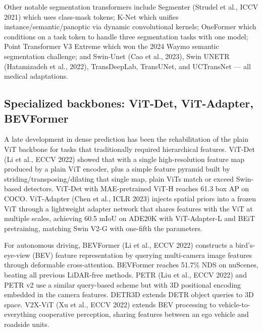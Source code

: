 Other notable segmentation transformers include Segmenter (Strudel et al., ICCV 2021) which uses class-mask tokens; K-Net which unifies instance/semantic/panoptic via dynamic convolutional kernels; OneFormer which conditions on a task token to handle three segmentation tasks with one model; Point Transformer V3 Extreme which won the 2024 Waymo semantic segmentation challenge; and Swin-Unet (Cao et al., 2023), Swin UNETR (Hatamizadeh et al., 2022), TransDeepLab, TransUNet, and UCTransNet --- all medical adaptations.

\subsection{Specialized backbones: ViT-Det, ViT-Adapter, BEVFormer}\label{specialized-backbones-vit-det-vit-adapter-bevformer}

A late development in dense prediction has been the rehabilitation of the plain ViT backbone for tasks that traditionally required hierarchical features. ViT-Det (Li et al., ECCV 2022) showed that with a single high-resolution feature map produced by a plain ViT encoder, plus a simple feature pyramid built by striding/transposing/dilating that single map, plain ViTs match or exceed Swin-based detectors. ViT-Det with MAE-pretrained ViT-H reaches 61.3 box AP on COCO. ViT-Adapter (Chen et al., ICLR 2023) injects spatial priors into a frozen ViT through a lightweight adapter network that shares features with the ViT at multiple scales, achieving 60.5 mIoU on ADE20K with ViT-Adapter-L and BEiT pretraining, matching Swin V2-G with one-fifth the parameters.

For autonomous driving, BEVFormer (Li et al., ECCV 2022) constructs a bird's-eye-view (BEV) feature representation by querying multi-camera image features through deformable cross-attention. BEVFormer reaches 51.7\% NDS on nuScenes, beating all previous LiDAR-free methods. PETR (Liu et al., ECCV 2022) and PETR v2 use a similar query-based scheme but with 3D positional encoding embedded in the camera features. DETR3D extends DETR object queries to 3D space. V2X-ViT (Xu et al., ECCV 2022) extends BEV processing to vehicle-to-everything cooperative perception, sharing features between an ego vehicle and roadside units.

